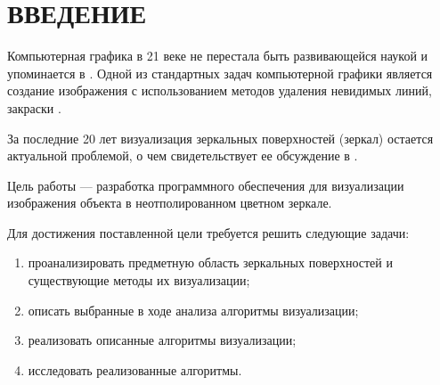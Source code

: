 \chapter*{ВВЕДЕНИЕ}

Компьютерная графика в 21 веке не перестала быть развивающейся наукой и упоминается в \cite{залогова2005компьютерная,порев2002компьютерная,тозик2013инженерная,митин2016компьютерная,турлюн2014компьютерная}. Одной из стандартных задач компьютерной графики является создание изображения с использованием методов удаления невидимых линий, закраски \cite{порев2002компьютерная}.

За последние 20 лет визуализация зеркальных поверхностей (зеркал) остается актуальной проблемой, о чем свидетельствует ее обсуждение в \cite{lensch2005realistic,reshetouski2013mirrors,miguel2014real,hiranyachattada2021demonstration}.

Цель работы --- разработка программного обеспечения для визуализации изображения объекта в неотполированном цветном зеркале.

Для достижения поставленной цели требуется решить следующие задачи:

\begin{enumerate}
	\item проанализировать предметную область зеркальных поверхностей и существующие методы их визуализации;
	\item описать выбранные в ходе анализа алгоритмы визуализации;
	\item реализовать описанные алгоритмы визуализации;
	\item исследовать реализованные алгоритмы.
\end{enumerate}